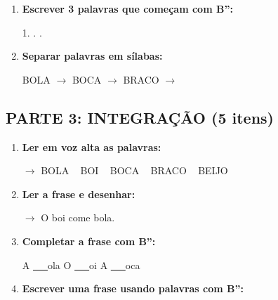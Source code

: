 \begin{exercicio}
\begin{enumerate}[resume]
  \item \textbf{Escrever 3 palavras que começam com B'':}
  \begin{center}
  1. \underline{\hspace{3cm}} . \underline{\hspace{3cm}} . \underline{\hspace{3cm}}
  \end{center}

  \item \textbf{Separar palavras em sílabas:}
  \begin{center}
  BOLA $\rightarrow$ \underline{\hspace{1.5cm}} \quad BOCA $\rightarrow$ \underline{\hspace{1.5cm}} \quad BRACO $\rightarrow$ \underline{\hspace{1.5cm}}
  \end{center}
\end{enumerate}

\subsection*{PARTE 3: INTEGRAÇÃO (5 itens)}

\begin{enumerate}[resume]
  \item \textbf{Ler em voz alta as palavras:}
  \begin{center}
  $\rightarrow$ BOLA  ~  BOI  ~  BOCA  ~  BRACO  ~  BEIJO
  \end{center}

  \item \textbf{Ler a frase e desenhar:}
  \begin{center}
  $\rightarrow$ O boi come bola.
  \end{center}
  \begin{center}
  \end{center}

  \item \textbf{Completar a frase com B'':}
  \begin{center}
  A \underline{~~~}ola \quad O \underline{~~~}oi \quad A \underline{~~~}oca
  \end{center}

  \item \textbf{Escrever uma frase usando palavras com B'':}
  \begin{center}
  \underline{\hspace{12cm}}
  \end{center}


\end{enumerate}
\end{exercicio}
